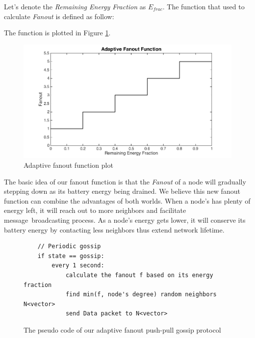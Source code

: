 \documentclass[onehalf,11pt]{beavtex}
\newcommand{\gp}{gossip protocol}
\newcommand{\msg}{message}
\begin{document}
Let's denote the \emph{Remaining Energy Fraction} as $E_{frac}$. The function that used to calculate \emph{Fanout} is defined as follow:





The function is plotted in Figure \ref{fig:step}.

\begin{figure}[h]
	\centering
	\includegraphics[width=5.5in]{stepFunction2.png}
	\caption{Adaptive fanout function plot}
	\label{fig:step}
\end{figure}

The basic idea of our fanout function is that the \emph{Fanout} of a node will gradually stepping down as its battery energy being drained. We believe this new fanout function can combine the advantages of both worlds. When a node's has plenty of energy left, it will reach out to more neighbors and facilitate \msg ~broadcasting process. As a node's energy gets lower, it will conserve its battery energy by contacting less neighbors thus extend network lifetime.

\begin{figure}[!htbp]
	\centering
	\begin{Verbatim}
	// Periodic gossip	
	if state == gossip:
		every 1 second:
			calculate the fanout f based on its energy fraction
			find min(f, node's degree) random neighbors N<vector>
			send Data packet to N<vector>
	\end{Verbatim}
	\caption{The pseudo code of our adaptive fanout push-pull \gp}
	\label{fig:gossip}
\end{figure}
\end{document}
